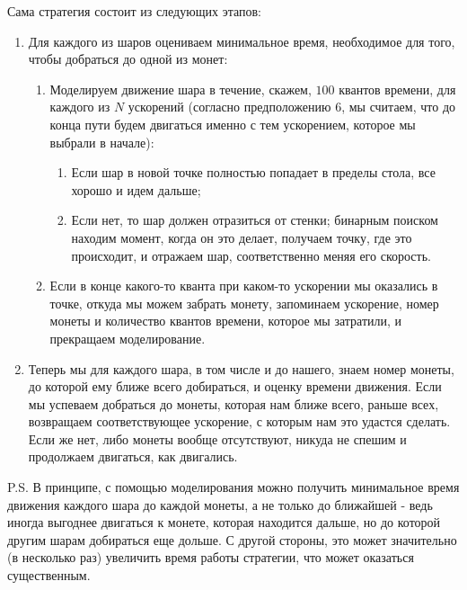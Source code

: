 ﻿\documentclass[12pt,a4paper]{article}
\begin{document}
Сама стратегия состоит из следующих этапов:
\begin{enumerate} 
\item Для каждого из шаров оцениваем минимальное время, необходимое для того, чтобы добраться до одной из монет:
\begin{enumerate} 
\item Моделируем движение шара в течение, скажем, \(100\) квантов времени, для каждого из \(N\) ускорений (согласно предположению 6, мы считаем, что до конца пути будем двигаться именно с тем ускорением, которое мы выбрали в начале):
\begin{enumerate} 
\item Если шар в новой точке полностью попадает в пределы стола, все хорошо и идем дальше;
\item Если нет, то шар должен отразиться от стенки; бинарным поиском находим момент, когда он это делает, получаем точку, где это происходит, и отражаем шар, соответственно меняя его скорость.
\end{enumerate} 
\item Если в конце какого-то кванта при каком-то ускорении мы оказались в точке, откуда мы можем забрать монету, запоминаем ускорение, номер монеты и количество квантов времени, которое мы затратили, и прекращаем моделирование.
\end{enumerate} 
\item Теперь мы для каждого шара, в том числе и до нашего, знаем номер монеты, до которой ему ближе всего добираться, и оценку времени движения. Если мы успеваем добраться до монеты, которая нам ближе всего, раньше всех, возвращаем соответствующее ускорение, с которым нам это удастся сделать. Если же нет, либо монеты вообще отсутствуют, никуда не спешим и продолжаем двигаться, как двигались.
\end{enumerate} 

P.S. В принципе, с помощью моделирования можно получить минимальное время движения каждого шара до каждой монеты, а не только до ближайшей - ведь иногда выгоднее двигаться к монете, которая находится дальше, но до которой другим шарам добираться еще дольше. С другой стороны, это может значительно (в несколько раз) увеличить время работы стратегии, что может оказаться существенным.
\end{document}
